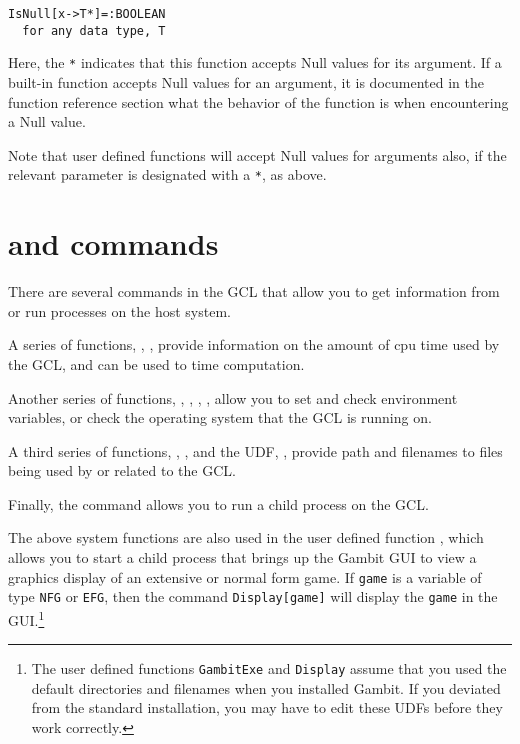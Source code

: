 \begin{verbatim}
IsNull[x->T*]=:BOOLEAN
  for any data type, T
\end{verbatim}

Here, the \verb+*+ indicates that this function accepts Null values
for its argument.  If a built-in function accepts Null values for an
argument, it is documented in the function reference section what the
behavior of the function is when encountering a Null value.  

Note that user defined functions  will accept Null values for
arguments also, if the relevant parameter is designated with a
\verb+*+, as above. 

\section{ and commands}

There are several commands in the GCL that allow you to get
information from or run processes on the host system.  

A series of functions, , ,
 provide information on the amount of cpu time
used by the GCL, and can be used to time computation.  

Another series of functions, , ,
, , allow you to set and check
environment variables, or check the operating system that the GCL is
running on.

A third series of functions, , , and the
UDF, , provide path and filenames to files being used
by or related to the GCL.

Finally, the  command allows you to run a child process on
the GCL.  

The above system functions are also used in the user defined function
, which allows you to start a child process that brings
up the Gambit GUI to view a graphics display of an extensive or normal
form game. If \verb+game+ is a variable of type \verb+NFG+ or
\verb+EFG+, then the command \verb+Display[game]+ will display the
\verb+game+ in the GUI.\footnote{The user defined functions
\verb+GambitExe+ and \verb+Display+ assume that you used the default
directories and filenames when you installed Gambit.  If you deviated
from the standard installation, you may have to edit these UDFs
before they work correctly.}

